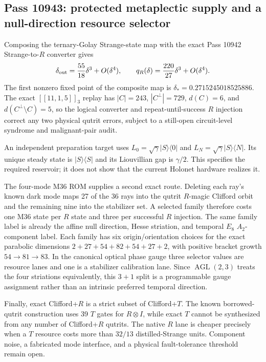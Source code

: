 \subsection{Pass 10943: protected metaplectic supply and a null-direction resource selector}

Composing the ternary-Golay Strange-state map with the exact Pass 10942
Strange-to-$R$ converter gives
\[
 \delta_{\rm out}=\frac{55}{18}\delta^3+O(\delta^4),\qquad
 q_R(\delta)=\frac{220}{27}\delta^3+O(\delta^4).
\]
The first nonzero fixed point of the composite map is
$\delta_*=0.2715245018525886$. The exact $[[11,1,5]]_3$ replay has
$|C|=243$, $|C^\perp|=729$, $d(C)=6$, and
$d(C^\perp\setminus C)=5$, so the logical converter and repeat-until-success
$R$ injection correct any two physical qutrit errors, subject to a still-open
circuit-level syndrome and malignant-pair audit.

An independent preparation target uses
$L_0=\sqrt\gamma|S\rangle\langle0|$ and
$L_N=\sqrt\gamma|S\rangle\langle N|$. Its unique steady state is
$|S\rangle\langle S|$ and its Liouvillian gap is $\gamma/2$. This specifies
the required reservoir; it does not show that the current Holonet hardware
realizes it.

The four-mode M36 ROM supplies a second exact route. Deleting each ray's known
dark mode maps 27 of the 36 rays into the qutrit $R$-magic Clifford orbit and
the remaining nine into the stabilizer set. A selected family therefore costs
one M36 state per $R$ state and three per successful $R$ injection. The same
family label is already the affine null direction, Hesse striation, and
temporal $E_8$ $A_2$-component label. Each family has six origin/orientation
choices for the exact parabolic dimensions
$2+27+54+82+54+27+2$, with positive bracket growth $54\to81\to83$.
In the canonical optical phase gauge
three selector values are resource lanes and one is a stabilizer calibration
lane. Since $\operatorname{AGL}(2,3)$ treats the four striations equivalently,
this $3+1$ split is a programmable gauge assignment rather than an intrinsic
preferred temporal direction.

Finally, exact Clifford+$R$ is a strict subset of Clifford+$T$. The known
borrowed-qutrit construction uses 39 $T$ gates for $R\otimes I$, while exact
$T$ cannot be synthesized from any number of Clifford+$R$ qutrits. The native
$R$ lane is cheaper precisely when a $T$ resource costs more than $32/13$
distilled-Strange units. Component noise, a fabricated mode interface, and a
physical fault-tolerance threshold remain open.
